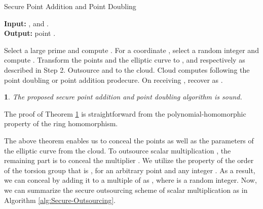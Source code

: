 \documentclass[english,draftcls,onecolumn,11pt]{IEEEtran}
\theoremstyle{definition}
\theoremstyle{plain}
\newtheorem{thm}{\protect\theoremname}
\theoremstyle{plain}
\theoremstyle{definition}
\providecommand{\theoremname}{Theorem}
\begin{document}
\begin{algorithm}[tbh] 
\caption{Secure Point Addition and Point Doubling\label{alg:Secure-Point-Addition}}

\textbf{Input:} ,  and .\\
\textbf{Output:} point .

\begin{algorithmic}[1] 
\STATE Select a large prime  and compute . 
\STATE For a coordinate , select a random integer  and compute .
\STATE Transform the points  and the elliptic curve  to ,  and  respectively as described in Step 2. 
\STATE Outsource  and  to the cloud.
\STATE Cloud computes  following the point doubling or point addition prodecure.
\STATE On receiving , recover  as .
\end{algorithmic} 
\end{algorithm}
\begin{thm}
\label{thm:The-proposed-secure}The proposed secure point addition
and point doubling algorithm is sound.
\end{thm}
The proof of Theorem \ref{thm:The-proposed-secure} is straightforward
from the polynomial-homomorphic property of the ring homomorphism.

The above theorem enables us to conceal the points as well as the
parameters of the elliptic curve from the cloud. To outsource scalar
multiplication , the remaining part is to conceal the multiplier
. We utilize the property of the order  of the torsion group
that is , for an arbitrary point 
and any integer . As a result, we can conceal  by adding it
to a multiple of  as , where  is a random
integer. Now, we can summarize the secure outsourcing scheme of scalar
multiplication as in Algorithm \ref{alg:Secure-Outsourcing}.
\end{document}
